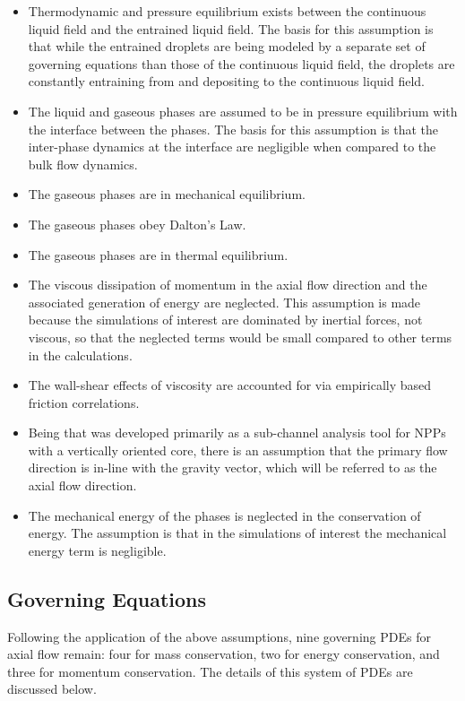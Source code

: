 \begin{itemize}
\item{
Thermodynamic and pressure equilibrium exists between the continuous liquid field and the entrained liquid field.
The basis for this assumption is that while the entrained droplets are being modeled by a separate set of governing equations than those of the continuous liquid field, the droplets are constantly entraining from and depositing to the continuous liquid field. 
}
\item{
The liquid and gaseous phases are assumed to be in pressure equilibrium with the interface between the phases.
The basis for this assumption is that the inter-phase dynamics at the interface are negligible when compared to the bulk flow dynamics.
}
\item{The gaseous phases are in mechanical equilibrium.}
\item{The gaseous phases obey Dalton's Law.}
\item{The gaseous phases are in thermal equilibrium.}
\item{
The viscous dissipation of momentum in the axial flow direction and the associated generation of energy are neglected.
This assumption is made because the simulations of interest are dominated by inertial forces, not viscous, so that the neglected terms would be small compared to other terms in the calculations.
}
\item{
The wall-shear effects of viscosity are accounted for via empirically based friction correlations.
}
\item{
Being that \cobra{} was developed primarily as a sub-channel analysis tool for NPPs with a vertically oriented core, there is an assumption that the primary flow direction is in-line with the gravity vector, which will be referred to as the axial flow direction.}
\item{
The mechanical energy of the phases is neglected in the conservation of energy. 
The assumption is that in the simulations of interest the mechanical energy term is negligible.
}
\end{itemize}

\subsection{Governing Equations}
\label{subsect:governing_equations}

Following the application of the above assumptions, nine governing PDEs for axial flow remain: four for mass  conservation, two for energy conservation, and three for momentum conservation.
The details of this system of PDEs are discussed below.

